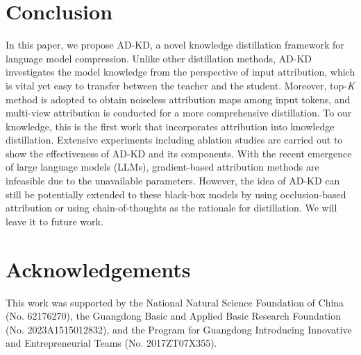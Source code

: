 \documentclass[11pt]{article}
\begin{document}


\section{Conclusion}
In this paper, we propose AD-KD, a novel knowledge distillation framework for language model compression. Unlike other distillation methods, AD-KD investigates the model knowledge from the perspective of input attribution, which is vital yet easy to transfer between the teacher and the student. Moreover, top-\textit{K} method is adopted to obtain noiseless attribution maps among input tokens, and multi-view attribution is conducted for a more comprehensive distillation. To our knowledge, this is the first work that incorporates attribution into knowledge distillation. Extensive experiments including ablation studies are carried out to show the effectiveness of AD-KD and its components. 
With the recent emergence of large language models (LLMs), gradient-based attribution methods are infeasible due to the unavailable parameters. However, the idea of AD-KD can still be potentially extended to these black-box models by using occlusion-based attribution or using chain-of-thoughts \citep{wei2022chain} as the rationale for distillation. We will leave it to future work.

\section*{Acknowledgements}
This work was supported by the National Natural Science Foundation of China (No. 62176270), the Guangdong Basic and Applied Basic Research Foundation (No. 2023A1515012832), and the Program for Guangdong Introducing Innovative and Entrepreneurial Teams (No. 2017ZT07X355).
\end{document}
